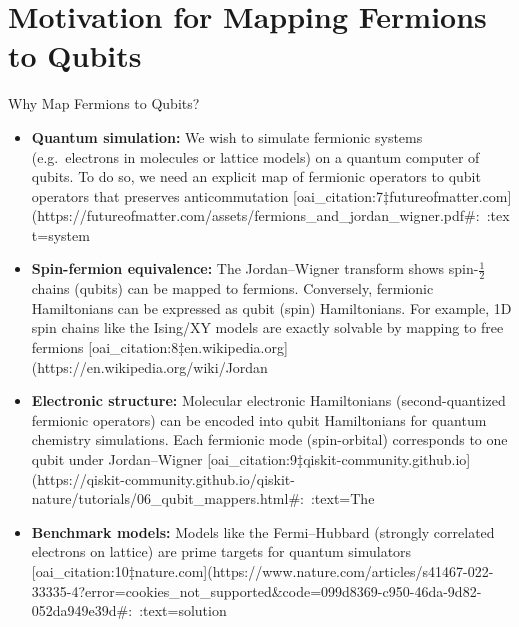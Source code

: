\documentclass{beamer}
\begin{document}
\section{Motivation for Mapping Fermions to Qubits}
\begin{frame}{Why Map Fermions to Qubits?}
\begin{itemize}
  \item \textbf{Quantum simulation:} We wish to simulate fermionic systems (e.g.\ electrons in molecules or lattice models) on a quantum computer of qubits.  To do so, we need an explicit map of fermionic operators to qubit operators that preserves anticommutation [oai_citation:7‡futureofmatter.com](https://futureofmatter.com/assets/fermions_and_jordan_wigner.pdf#:~:text=system%
  \item \textbf{Spin-fermion equivalence:} The Jordan–Wigner transform shows spin-$\frac12$ chains (qubits) can be mapped to fermions.  Conversely, fermionic Hamiltonians can be expressed as qubit (spin) Hamiltonians.  For example, 1D spin chains like the Ising/XY models are exactly solvable by mapping to free fermions [oai_citation:8‡en.wikipedia.org](https://en.wikipedia.org/wiki/Jordan%
  \item \textbf{Electronic structure:} Molecular electronic Hamiltonians (second-quantized fermionic operators) can be encoded into qubit Hamiltonians for quantum chemistry simulations.  Each fermionic mode (spin-orbital) corresponds to one qubit under Jordan–Wigner [oai_citation:9‡qiskit-community.github.io](https://qiskit-community.github.io/qiskit-nature/tutorials/06_qubit_mappers.html#:~:text=The%
  \item \textbf{Benchmark models:} Models like the Fermi–Hubbard (strongly correlated electrons on lattice) are prime targets for quantum simulators [oai_citation:10‡nature.com](https://www.nature.com/articles/s41467-022-33335-4?error=cookies_not_supported&code=099d8369-c950-46da-9d82-052da949e39d#:~:text=solution%
\end{itemize}
\end{frame}
\end{document}
